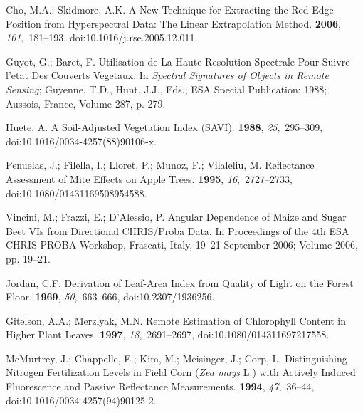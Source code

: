 \documentclass[remotesensing,article,accept,moreauthors,pdftex]{Definitions/mdpi}
\begin{document}
\begin{thebibliography}{999}
Cho, M.A.; Skidmore, A.K.
\newblock A New Technique for Extracting the Red Edge Position from
  Hyperspectral Data: The Linear Extrapolation Method.
 {\bf 2006}, {\em 101},~181--193, doi:10.1016/j.rse.2005.12.011.

Guyot, G.; Baret, F.
\newblock Utilisation de La Haute Resolution Spectrale Pour Suivre l'etat Des
  Couverts Vegetaux.
\newblock  In \emph{Spectral Signatures of Objects in Remote Sensing}; Guyenne, T.D.,
  Hunt, J.J., Eds.;  {ESA Special Publication}: 1988; Aussois, France, Volume 287, p. 279.

Huete, A.
\newblock A Soil-Adjusted Vegetation Index ({{SAVI}}).
 {\bf 1988}, {\em 25},~295--309, doi:10.1016/0034-4257(88)90106-x.

Penuelas, J.; Filella, I.; Lloret, P.; Munoz, F.; Vilaleliu, M.
\newblock Reflectance Assessment of Mite Effects on Apple Trees.
 {\bf 1995}, {\em
  16},~2727--2733, doi:10.1080/01431169508954588.

Vincini, M.; Frazzi, E.; D'Alessio, P.
\newblock Angular Dependence of Maize and Sugar Beet {{VIs}} from Directional
  {{CHRIS}}/{{Proba}} Data.
\newblock  In Proceedings of the 4th {{ESA CHRIS PROBA}} Workshop,  Frascati, Italy, 19--21 September 2006; Volume 2006, pp.
  19--21.

Jordan, C.F.
\newblock Derivation of Leaf-Area Index from Quality of Light on the Forest
  Floor.
 {\bf 1969}, {\em 50},~663--666, doi:10.2307/1936256.

Gitelson, A.A.; Merzlyak, M.N.
\newblock Remote Estimation of Chlorophyll Content in Higher Plant Leaves.
 {\bf 1997}, {\em
  18},~2691--2697, doi:10.1080/014311697217558.

McMurtrey, J.; Chappelle, E.; Kim, M.; Meisinger, J.; Corp, L.
\newblock Distinguishing Nitrogen Fertilization Levels in Field Corn (\emph{{{Zea}}
  mays} {{L}}.) with Actively Induced Fluorescence and Passive Reflectance
  Measurements.
 {\bf 1994}, {\em 47},~36--44, doi:10.1016/0034-4257(94)90125-2.


\end{thebibliography}
\end{document}
